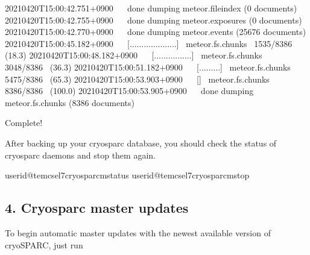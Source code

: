 \documentclass[a4paper,11pt,english]{sphinxmanual}
\begin{document}
\begin{sphinxVerbatim}[commandchars=\\\{\}]
2021\PYGZhy{}04\PYGZhy{}20T15:00:42.751+0900    done dumping meteor.file\PYGZus{}index (0 documents)
2021\PYGZhy{}04\PYGZhy{}20T15:00:42.755+0900    done dumping meteor.exposures (0 documents)
2021\PYGZhy{}04\PYGZhy{}20T15:00:42.770+0900    done dumping meteor.events (25676 documents)
2021\PYGZhy{}04\PYGZhy{}20T15:00:45.182+0900    [\PYGZsh{}\PYGZsh{}\PYGZsh{}\PYGZsh{}....................]  meteor.fs.chunks  1535/8386  (18.3\PYGZpc{})
2021\PYGZhy{}04\PYGZhy{}20T15:00:48.182+0900    [\PYGZsh{}\PYGZsh{}\PYGZsh{}\PYGZsh{}\PYGZsh{}\PYGZsh{}\PYGZsh{}\PYGZsh{}................]  meteor.fs.chunks  3048/8386  (36.3\PYGZpc{})
2021\PYGZhy{}04\PYGZhy{}20T15:00:51.182+0900    [\PYGZsh{}\PYGZsh{}\PYGZsh{}\PYGZsh{}\PYGZsh{}\PYGZsh{}\PYGZsh{}\PYGZsh{}\PYGZsh{}\PYGZsh{}\PYGZsh{}\PYGZsh{}\PYGZsh{}\PYGZsh{}\PYGZsh{}.........]  meteor.fs.chunks  5475/8386  (65.3\PYGZpc{})
2021\PYGZhy{}04\PYGZhy{}20T15:00:53.903+0900    [\PYGZsh{}\PYGZsh{}\PYGZsh{}\PYGZsh{}\PYGZsh{}\PYGZsh{}\PYGZsh{}\PYGZsh{}\PYGZsh{}\PYGZsh{}\PYGZsh{}\PYGZsh{}\PYGZsh{}\PYGZsh{}\PYGZsh{}\PYGZsh{}\PYGZsh{}\PYGZsh{}\PYGZsh{}\PYGZsh{}\PYGZsh{}\PYGZsh{}\PYGZsh{}\PYGZsh{}]  meteor.fs.chunks  8386/8386  (100.0\PYGZpc{})
2021\PYGZhy{}04\PYGZhy{}20T15:00:53.905+0900    done dumping meteor.fs.chunks (8386 documents)

Complete!
\end{sphinxVerbatim}

\sphinxAtStartPar
After backing up your cryosparc database, you should check the status of cryosparc daemons and stop them again.

\begin{sphinxVerbatim}[commandchars=\\\{\}]
userid@tem\PYGZhy{}cs\PYGZhy{}el7\PYGZdl{}\PYGZgt{}cryosparcmstatus
userid@tem\PYGZhy{}cs\PYGZhy{}el7\PYGZdl{}\PYGZgt{}cryosparcmstop
\end{sphinxVerbatim}


\subsection{4. Cryosparc master updates}
\label{\detokenize{faq:cryosparc-master-updates}}
\sphinxAtStartPar
To begin automatic master updates with the newest available version of cryoSPARC, just run
\end{document}
